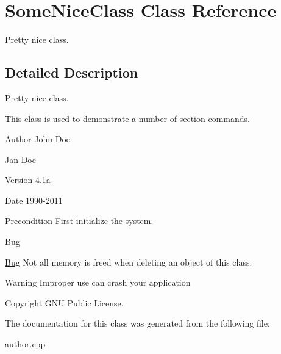 \hypertarget{class_some_nice_class}{\section{Some\-Nice\-Class Class Reference}
\label{class_some_nice_class}
}


Pretty nice class.  




\subsection{Detailed Description}
Pretty nice class. 

This class is used to demonstrate a number of section commands. \begin{DoxyAuthor}{Author}
John Doe 

Jan Doe 
\end{DoxyAuthor}
\begin{DoxyVersion}{Version}
4.\-1a 
\end{DoxyVersion}
\begin{DoxyDate}{Date}
1990-\/2011 
\end{DoxyDate}
\begin{DoxyPrecond}{Precondition}
First initialize the system. 
\end{DoxyPrecond}
\begin{DoxyRefDesc}{Bug}
\item[\hyperlink{bug__bug000001}{Bug}]Not all memory is freed when deleting an object of this class. \end{DoxyRefDesc}
\begin{DoxyWarning}{Warning}
Improper use can crash your application 
\end{DoxyWarning}
\begin{DoxyCopyright}{Copyright}
G\-N\-U Public License. 
\end{DoxyCopyright}


The documentation for this class was generated from the following file\-:\begin{DoxyCompactItemize}
\item 
author.\-cpp\end{DoxyCompactItemize}
